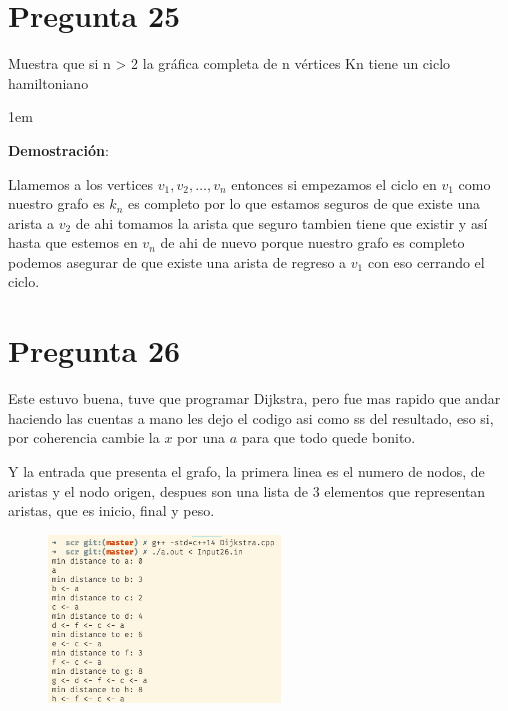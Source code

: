 \documentclass[12pt, fleqn]{article}                            %
\newenvironment{SmallIndentation}[1][0.75em]                    %
        {\begin{adjustwidth}{#1}{}\begin{footnotesize}}             %
        {\end{footnotesize}\end{adjustwidth}}                       %
\theoremstyle{break}                                            %
\begin{document}
    \section{Pregunta 25}

        Muestra que si n > 2 la gráfica completa de n vértices Kn tiene un ciclo
        hamiltoniano

        \begin{SmallIndentation}[1em]
            \textbf{Demostración}:
        
            Llamemos a los vertices $v_1, v_2, \dots, v_n$ entonces si empezamos el ciclo en $v_1$ como nuestro grafo es 
            $k_n$ es completo por lo que estamos seguros de que existe una arista a $v_2$ de ahi tomamos la arista que seguro
            tambien tiene que existir y así hasta que estemos en $v_n$ de ahi de nuevo porque nuestro grafo es completo podemos
            asegurar de que existe una arista de regreso a $v_1$ con eso cerrando el ciclo.
        
        \end{SmallIndentation}

    \section{Pregunta 26}


       Este estuvo buena, tuve que programar Dijkstra, pero fue mas rapido que andar haciendo las cuentas a mano
       les dejo el codigo asi como ss del resultado, eso si, por coherencia cambie la $x$ por una $a$ para que todo quede bonito.

        

        Y la entrada que presenta el grafo, la primera linea es el numero de nodos, de aristas y el nodo origen,
        despues son una lista de 3 elementos que representan aristas, que es inicio, final y peso.

        

        \begin{figure}[h]
            \centering
            \includegraphics[width=0.55\textwidth]{Question26}
        \end{figure}
\end{document}

